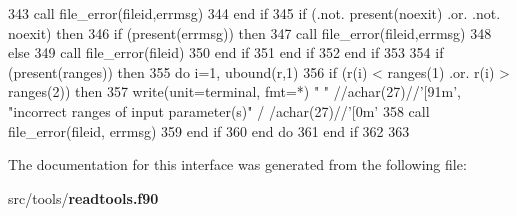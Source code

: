 \begin{DoxyCode}
343           \textcolor{keyword}{call }file_error(fileid,errmsg)
344 \textcolor{keywordflow}{        end if}
345         \textcolor{keywordflow}{if} (.not. \textcolor{keyword}{present}(noexit) .or. .not. noexit) \textcolor{keywordflow}{then}
346           \textcolor{keywordflow}{if} (\textcolor{keyword}{present}(errmsg)) \textcolor{keywordflow}{then}
347             \textcolor{keyword}{call }file_error(fileid,errmsg)
348           \textcolor{keywordflow}{else}
349             \textcolor{keyword}{call }file_error(fileid)
350 \textcolor{keywordflow}{          end if}
351 \textcolor{keywordflow}{        end if}
352 \textcolor{keywordflow}{      end if}
353       
354       \textcolor{keywordflow}{if} (\textcolor{keyword}{present}(ranges)) \textcolor{keywordflow}{then}
355         \textcolor{keywordflow}{do} i=1, ubound(r,1)
356           \textcolor{keywordflow}{if} (r(i) < ranges(1) .or. r(i) > ranges(2)) \textcolor{keywordflow}{then}
357             \textcolor{keyword}{write}(unit=terminal, fmt=*) \textcolor{stringliteral}{" "} //achar(27)//\textcolor{stringliteral}{'[91m'}, \textcolor{stringliteral}{"incorrect ranges of input parameter(s)"}\textcolor{comment}{ /
      /achar(27)//}\textcolor{stringliteral}{'[0m'}
358             \textcolor{keyword}{call }file_error(fileid, errmsg)
359 \textcolor{keywordflow}{          end if}
360 \textcolor{keywordflow}{        end do}
361 \textcolor{keywordflow}{      end if}
362       
363       
\end{DoxyCode}


The documentation for this interface was generated from the following file\+:\begin{DoxyCompactItemize}
\item 
src/tools/{\bf readtools.\+f90}\end{DoxyCompactItemize}
